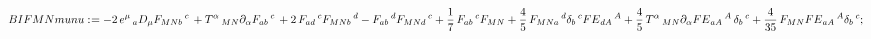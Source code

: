 \documentclass[11pt]{article}
\def\specialcolon{\mathrel{\mathop{:}}\hspace{-.5em}}
\begin{document}
\begin{dmath*}[compact, spread=2pt]
BIFMNmunu\specialcolon{}=  - 2\, {e}^{\mu}\,_{a} {D}_{\mu}{{F}_{M N b}\,^{c}}\,  + {T}^{\alpha}\,_{M N} {\partial}_{\alpha}{{F}_{a b}\,^{c}}\,  + 2\, {F}_{a d}\,^{c} {F}_{M N b}\,^{d} - {F}_{a b}\,^{d} {F}_{M N d}\,^{c} + \frac{1}{7}\, {F}_{a b}\,^{c} {F}_{M N} + \frac{4}{5}\, {F}_{M N a}\,^{d} {\delta}_{b}\,^{c} {FE}_{d A}\,^{A} + \frac{4}{5}\, {T}^{\alpha}\,_{M N} {\partial}_{\alpha}{{FE}_{a A}\,^{A}}\,  {\delta}_{b}\,^{c} + \frac{4}{35}\, {F}_{M N} {FE}_{a A}\,^{A} {\delta}_{b}\,^{c};
\end{dmath*}
\end{document}
